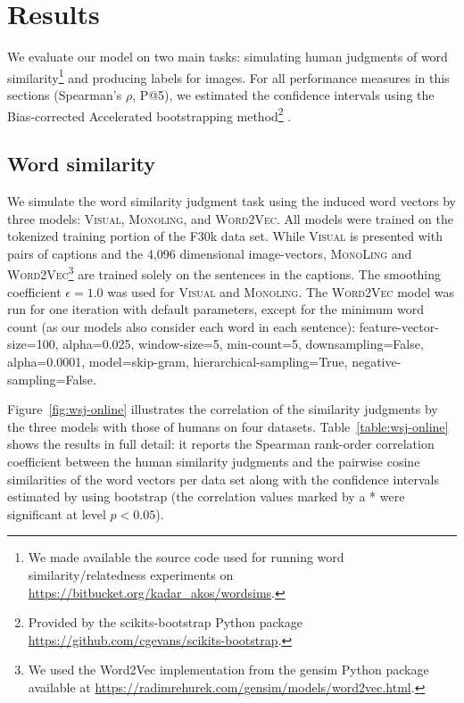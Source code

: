 \section{Results}
\label{sec:results_intro}
We evaluate our model on two main tasks: simulating human judgments of
word similarity\footnote{We made available the source code used for running word similarity/relatedness
experiments on \url{https://bitbucket.org/kadar_akos/wordsims}.} and producing labels for images. For all performance measures in this sections (Spearman's $\rho$, P@5), we estimated the confidence intervals
using the Bias-corrected Accelerated bootstrapping method\footnote{
Provided by the scikits-bootstrap Python package \url{https://github.com/cgevans/scikits-bootstrap}.}
\citep{efron1982jackknife}.

\subsection{Word similarity}
\label{sec:res_wordsim}

We simulate the word similarity judgment task using the induced word
vectors by three models: \textsc{Visual}, \textsc{Monoling}, and
\textsc{Word2Vec}. All models were trained on the tokenized training
portion of the F30k data set. While \textsc{Visual} is presented
with pairs of captions and the 4,096 dimensional image-vectors,
\textsc{MonoLing} and \label{rev:word2vec}\textsc{Word2Vec}\footnote{We used the Word2Vec implementation from the
gensim Python package available at \url{https://radimrehurek.com/gensim/models/word2vec.html}.
} are trained solely on the sentences in the captions. The smoothing coefficient $\epsilon=1.0$ was used for
\textsc{Visual} and \textsc{Monoling}. The \textsc{Word2Vec} model was
run for one iteration with default parameters, except for the minimum
word count (as our models also consider each word in each sentence):
{\footnotesize feature-vector-size=100, alpha=0.025, window-size=5,
  min-count=5, downsampling=False, alpha=0.0001, model=skip-gram,
  hierarchical-sampling=True, negative-sampling=False}.


Figure~\ref{fig:wsj-online} illustrates the correlation of the similarity
judgments by the three models with those of humans on four
datasets. Table~\ref{table:wsj-online} shows the results in full detail:
it reports the Spearman rank-order correlation coefficient between the
human similarity judgments and the pairwise cosine similarities of the
word vectors per data set along with the confidence intervals
estimated by using bootstrap (the correlation values marked by a * were
significant at level $p<0.05$).\label{rev:wordsim_details}

